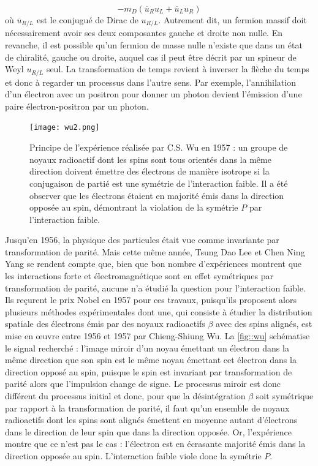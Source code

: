 			\begin{equation}\label{eq::dirac_mass}
			-m_D(\overline{u}_R u_L + \overline{u}_L u_R)
			\end{equation}
			où $\overline{u}_{R/L}$ est le conjugué de Dirac de $u_{R/L}$. Autrement dit, un fermion massif doit nécessairement avoir ses deux composantes gauche et droite non nulle. En revanche, il est possible qu'un fermion de masse nulle n'existe que dans un état de chiralité, gauche ou droite, auquel cas il peut être décrit par un spineur de Weyl $u_{R/L}$ seul. La transformation de temps revient à inverser la flèche du temps et donc à regarder un processus dans l'autre sens. Par exemple, l'annihilation d'un électron avec un positron pour donner un photon devient l'émission d'une paire électron-positron par un photon.
			
			\begin{figure}
				\texttt{[image: wu2.png]}
				\caption[Principe de l'expérience réalisée par C.S. Wu en 1957.]{\label{fig::wu}Principe de l'expérience réalisée par C.S. Wu en 1957 : un groupe de noyaux radioactif dont les spins sont tous orientés dans la même direction doivent émettre des électrons de manière isotrope si la conjugaison de partié est une symétrie de l'interaction faible. Il a été observer que les électrons étaient en majorité émis dans la direction opposée au spin, démontrant la violation de la symétrie $P$ par l'interaction faible.}
			\end{figure}
			Jusqu'en 1956, la physique des particules était vue comme invariante par transformation de parité. Mais cette même année, Tsung Dao Lee et Chen Ning Yang\cite{Lee1956} se rendent compte que, bien que bon nombre d'expériences montrent que les interactions forte et électromagnétique sont en effet symétriques par transformation de parité, aucune n'a étudié la question pour l'interaction faible. Ils reçurent le prix Nobel en 1957 pour ces travaux, puisqu'ils proposent alors plusieurs méthodes expérimentales dont une, qui consiste à étudier la distribution spatiale des électrons émis par des noyaux radioactifs $\beta$ avec des spins alignés, est mise en œuvre entre 1956 et 1957 par Chieng-Shiung Wu. La \autoref{fig::wu} schématise le signal recherché : l'image miroir d'un noyau émettant un électron dans la même direction que son spin est le même noyau émettant cet électron dans la direction opposé au spin, puisque le spin est invariant par transformation de parité alors que l'impulsion change de signe. Le processus miroir est donc différent du processus initial et donc, pour que la désintégration $\beta$ soit symétrique par rapport à la transformation de parité, il faut qu'un ensemble de noyaux radioactifs dont les spins sont alignés émettent en moyenne autant d'électrons dans le direction de leur spin que dans la direction opposée. Or, l'expérience montre que ce n'est pas le cas : l'électron est en écrasante majorité émis dans la direction opposée au spin\cite{Wu1957}. L'interaction faible viole donc la symétrie $P$.
			
